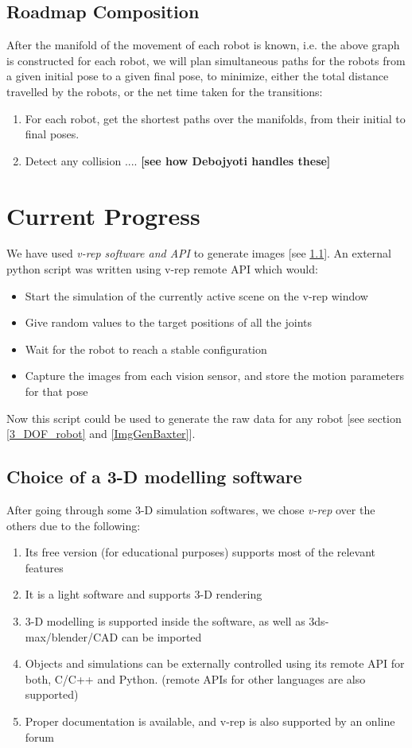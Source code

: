 \documentclass[12pt, two column]{article}
\begin{document}
\subsection{Roadmap Composition}
  After the manifold of the movement of each robot is known, i.e. the above graph is constructed for each robot, we will plan simultaneous paths for the robots from a given initial pose to a given final pose, to minimize, either the total distance travelled by the robots, or the net time taken for the transitions:
  \begin{enumerate}
    \item For each robot, get the shortest paths over the manifolds, from their initial to final poses.
    \item Detect any collision .... \textbf{[see how Debojyoti handles these]}
  \end{enumerate}

\section{Current Progress}
  We have used \textit{v-rep software and API} to generate images [see \ref{v-rep}].
  An external python script was written using v-rep remote API which would:
  \begin{itemize} 
    \item Start the simulation of the currently active scene on the v-rep window
    \item Give random values to the target positions of all the joints
    \item Wait for the robot to reach a stable configuration
    \item Capture the images from each vision sensor, and store the motion parameters for that pose
  \end{itemize}
  Now this script could be used to generate the raw data for any robot [see section \ref{3_DOF_robot} and \ref{ImgGenBaxter}].

\subsection{Choice of a 3-D modelling software}
\label{v-rep}
After going through some 3-D simulation softwares, we chose \textit{v-rep} over the others due to the following:
\begin{enumerate}
  \item Its free version (for educational purposes) supports most of the relevant features
  \item It is a light software and supports 3-D rendering
  \item 3-D modelling is supported inside the software, as well as 3ds-max/blender/CAD can be imported
  \item Objects and simulations can be externally controlled using its remote API for both, C/C++ and Python. (remote APIs for other languages are also supported)
  \item Proper documentation is available, and v-rep is also supported by an online forum
\end{enumerate}
\end{document}
